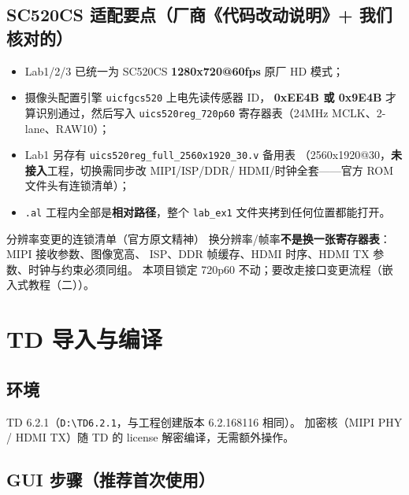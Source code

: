 \documentclass[11pt]{ctexart}
\newcommand{\code}[1]{\texttt{#1}}
\begin{document}
\subsection{SC520CS 适配要点（厂商《代码改动说明》+ 我们核对的）}

\begin{itemize}
  \item Lab1/2/3 已统一为 SC520CS \textbf{1280x720@60fps} 原厂 HD 模式；
  \item 摄像头配置引擎 \code{uicfgcs520} 上电先读传感器 ID，
    \textbf{0xEE4B 或 0x9E4B} 才算识别通过，然后写入
    \code{uics520reg\_720p60} 寄存器表（24MHz MCLK、2-lane、RAW10）；
  \item Lab1 另存有 \code{uics520reg\_full\_2560x1920\_30.v} 备用表
    （2560x1920@30，\textbf{未接入}工程，切换需同步改 MIPI/ISP/DDR/
    HDMI/时钟全套——官方 ROM 文件头有连锁清单）；
  \item \code{.al} 工程内全部是\textbf{相对路径}，整个 \code{lab\_ex1}
    文件夹拷到任何位置都能打开。
\end{itemize}

\begin{keybox}{分辨率变更的连锁清单（官方原文精神）}
换分辨率/帧率\textbf{不是换一张寄存器表}：MIPI 接收参数、图像宽高、
ISP、DDR 帧缓存、HDMI 时序、HDMI TX 参数、时钟与约束必须同组。
本项目锁定 720p60 不动；要改走接口变更流程（嵌入式教程（二））。
\end{keybox}

\section{TD 导入与编译}

\subsection{环境}

TD 6.2.1（\code{D:\textbackslash TD6.2.1}，与工程创建版本 6.2.168116 相同）。
加密核（MIPI PHY / HDMI TX）随 TD 的 license 解密编译，无需额外操作。

\subsection{GUI 步骤（推荐首次使用）}
\end{document}
